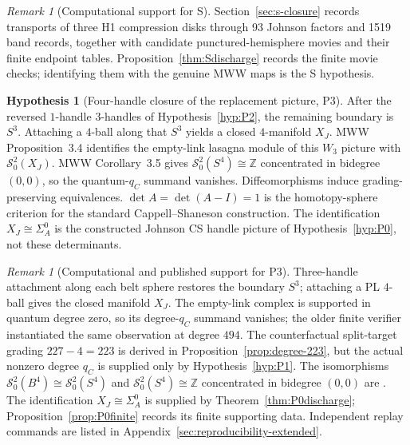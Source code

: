 \documentclass[11pt]{amsart}
\theoremstyle{definition}
\newtheorem{hypothesis}[theorem]{Hypothesis}
\theoremstyle{remark}
\newtheorem{remark}[theorem]{Remark}
\begin{document}
\begin{remark}[Computational support for S]
Section~\ref{sec:s-closure} records transports of three H1 compression disks
through 93 Johnson factors and 1519 band records, together with candidate
punctured-hemisphere movies and their finite endpoint tables.
Proposition~\ref{thm:Sdischarge} records the finite movie checks; identifying
them with the genuine MWW maps is the S hypothesis.
\end{remark}

\begin{hypothesis}[Four-handle closure of the replacement picture, P3]\label{hyp:P3}
After the reversed $1$-handle $3$-handles of Hypothesis~\ref{hyp:P2}, the
remaining boundary is $S^3$.  Attaching a $4$-ball along that $S^3$ yields a
closed $4$-manifold $X_J$.  MWW Proposition~3.4 identifies the empty-link
lasagna module of this $W_3$ picture with $\mathcal S^2_0(X_J)$.  MWW
Corollary~3.5 gives $\mathcal S^2_0(S^4)\cong\mathbb Z$ concentrated in
bidegree $(0,0)$, so the quantum-$q_C$ summand vanishes.  Diffeomorphisms
induce grading-preserving equivalences.  $\det A=\det(A-I)=1$ is the
homotopy-sphere criterion for the standard Cappell--Shaneson construction.
The identification $X_J\cong\Sigma_A^0$ is the constructed Johnson CS
handle picture of Hypothesis~\ref{hyp:P0}, not these determinants.
\end{hypothesis}

\begin{remark}[Computational and published support for P3]
Three-handle attachment along each belt sphere restores the boundary
$S^3$; attaching a PL $4$-ball gives the closed manifold $X_J$.  The
empty-link complex is supported in quantum degree zero, so its degree-$q_C$
summand vanishes; the older finite verifier instantiated the same observation
at degree $494$.  The counterfactual split-target grading $227-4=223$ is
derived in Proposition~\ref{prop:degree-223}, but the actual nonzero degree
$q_C$ is supplied only by Hypothesis~\ref{hyp:P1}.  The isomorphisms
$\mathcal S^2_0(B^4)\cong\mathcal S^2_0(S^4)$ and
$\mathcal S^2_0(S^4)\cong\mathbb Z$ concentrated in bidegree $(0,0)$ are
\cite[Proposition~3.4 and Corollary~3.5]{ManolescuWalkerWedrich2023}.
The identification $X_J\cong\Sigma_A^0$ is supplied by
Theorem~\ref{thm:P0discharge}; Proposition~\ref{prop:P0finite} records its
finite supporting data.
Independent replay commands are listed in
Appendix~\ref{sec:reproducibility-extended}.
\end{remark}
\end{document}
